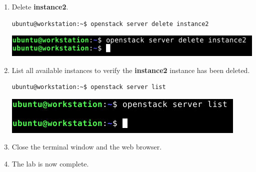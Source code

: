 \documentclass[letterpaper, 12pt]{article}
\begin{document}
\begin{enumerate}
    \item Delete \textbf{instance2}.
\begin{lstlisting}
ubuntu@workstation:~$ openstack server delete instance2
\end{lstlisting}

    \begin{center}
        \includegraphics[width=\linewidth]{images/part5/step19.png}
    \end{center}

    \item List all available instances to verify the \textbf{instance2} instance has been deleted.
\begin{lstlisting}
ubuntu@workstation:~$ openstack server list
\end{lstlisting}

    \begin{center}
        \includegraphics[width=\linewidth]{images/part5/step20.png}
    \end{center}

    \item Close the terminal window and the web browser.
    
    \item The lab is now complete.

\end{enumerate}
\end{document}

